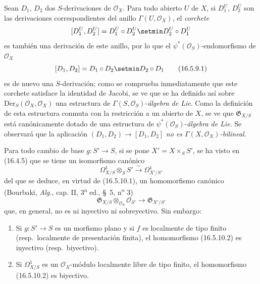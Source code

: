 \begin{env}[16.5.9]
\label{IV.16.5.9}
Sean $D_1$, $D_2$ dos $S$-derivaciones de $\mathcal{O}_X$. Para todo abierto
$U$ de $X$, si $D_1^U$, $D_2^U$ son las derivaciones correspondientes del
anillo $\Gamma(U,\mathcal{O}_X)$, el \emph{corchete}
\[
  [D_1^U,D_2^U]=D_1^U\circ D_2^U\setmin D_2^U\circ D_1^U
\]
es también una derivación de este anillo, por lo que el
$\psi^*(\mathcal{O}_S)$-endomorfismo de $\mathcal{O}_X$
\[
  [D_1,D_2]=D_1\circ D_2\setmin D_2\circ D_1
  \tag{16.5.9.1}
  \label{IV.16.5.9.1}
\]
es de nuevo una $S$-derivación; como se comprueba inmediatamente que este corchete
satisface la identidad de Jacobi, se ve que se ha definido así sobre
$\operatorname{D\acute{e}r}_S(\mathcal{O}_X,\mathcal{O}_X)$ una estructura de
$\Gamma(S,\mathcal{O}_S)$-\emph{álgebra de Lie}. Como la definición de esta
estructura conmuta con la restricción a un abierto de $X$, se ve que
$\mathfrak{G}_{X/S}$ está canónicamente dotado de una estructura de
$\psi^*(\mathcal{O}_S)$-\emph{álgebra de Lie}. Se observará que la aplicación
$(D_1,D_2)\to[D_1,D_2]$ \emph{no es
$\Gamma(X,\mathcal{O}_X)$-bilineal}.
\end{env}

\begin{env}[16.5.10]
\label{IV.16.5.10}
Para todo cambio de base $g:S'\to S$, si se pone $X'=X\times_S S'$, se
ha visto en (16.4.5) que se tiene un isomorfismo canónico
\[
  \varOmega_{X/S}^1\otimes_S S'\xrightarrow{\sim}\varOmega_{X'/S'}^1
  \tag{16.5.10.1}
  \label{IV.16.5.10.1}
\]
del que se deduce, en virtud de (16.5.10.1), un homomorfismo canónico
(Bourbaki, \emph{Alg.}, cap. II, 3\textsuperscript{a} ed., \S~5,
n\textsuperscript{o} 3)
\[
  \mathfrak{G}_{X/S}\otimes_{\mathcal{O}_S}\mathcal{O}_{S'}
  \longrightarrow\mathfrak{G}_{X'/S'}
  \tag{16.5.10.2}
  \label{IV.16.5.10.2}
\]
que, en general, no es ni inyectivo ni sobreyectivo. Sin embargo:
\end{env}

\begin{proposition}[16.5.11]
\label{IV.16.5.11}
\begin{enumerate}
\item[\textup{(i)}] Si $g:S'\to S$ es un morfismo plano y si $f$ es localmente de
tipo finito \textup{(resp.}\ localmente de presentación finita\textup{)}, el homomorfismo
\textup{(16.5.10.2)} es inyectivo \textup{(resp.}\ biyectivo\textup{)}.
\item[\textup{(ii)}] Si $\varOmega_{X/S}^1$ es un $\mathcal{O}_X$-módulo localmente libre
de tipo finito, el homomorfismo \textup{(16.5.10.2)} es biyectivo.
\end{enumerate}
\end{proposition}

